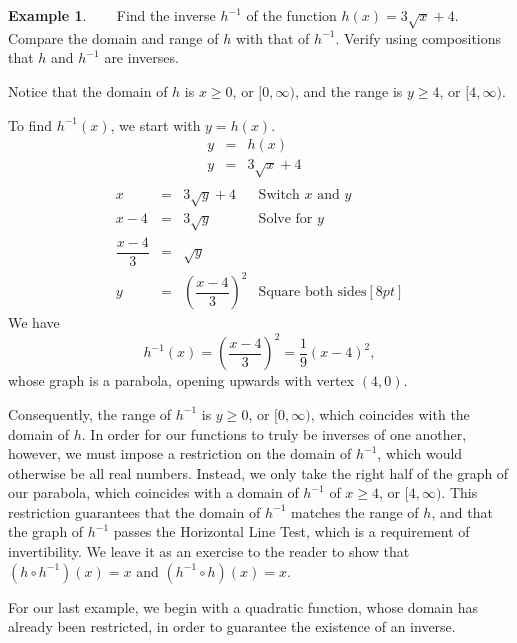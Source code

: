 \documentclass[12pt]{book}
\theoremstyle{definition}
\newtheorem{example}{Example}
\begin{document}
\begin{example}~~~  Find the inverse $h^{-1}$ of the function $h(x) = 3\sqrt{x}+4$.  Compare the domain and range of $h$ with that of $h^{-1}$.  Verify using compositions that $h$ and $h^{-1}$ are inverses.\par
Notice that the domain of $h$ is $x\geq 0$, or $[0,\infty)$, and the range is $y\geq 4$, or $[4,\infty)$.\par
To find $h^{-1}(x)$, we start with $y=h(x)$.
\[ \begin{array}{rcll}
y & = & h(x) & \\ [5pt]
y & = &  3\sqrt{x}+4 & \\ [7pt]
\end{array} \]
\[ \begin{array}{rcll}
x & = & 3\sqrt{y}+4 & \mbox{Switch $x$ and $y$} \\ [3pt]
x-4 & = & 3\sqrt{y} & \mbox{Solve for $y$} \\ [3pt]
\dfrac{x-4}{3} & = & \sqrt{y} & \\
y & = & \left(\dfrac{x-4}{3}\right)^2 & \mbox{Square both sides} [8pt]
\end{array} \]
We have $$h^{-1}(x) = \left(\dfrac{x-4}{3}\right)^2=\frac{1}{9}(x-4)^2,$$ whose graph is a parabola, opening upwards with vertex $(4,0)$.\par
Consequently, the range of $h^{-1}$ is $y\geq 0$, or $[0,\infty)$, which coincides with the domain of $h$.  In order for our functions to truly be inverses of one another, however, we must impose a restriction on the domain of $h^{-1}$, which would otherwise be all real numbers.  Instead, we only take the right half of the graph of our parabola, which coincides with a domain of $h^{-1}$ of $x\geq 4$, or $[4,\infty)$.  This restriction guarantees that the domain of $h^{-1}$ matches the range of $h$, and that the graph of $h^{-1}$ passes the Horizontal Line Test, which is a requirement of invertibility.  We leave it as an exercise to the reader to show that $(h\circ h^{-1})(x)=x$ and $(h^{-1}\circ h)(x)=x$.
\end{example}
For our last example, we begin with a quadratic function, whose domain has already been restricted, in order to guarantee the existence of an inverse.
\end{document}
